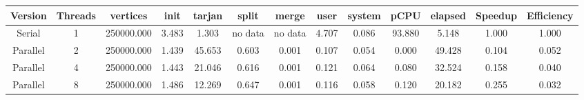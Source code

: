 \begin{tabular}{|c|c|c|c|c|c|c|c|c|c|c|c|c|}
\toprule
 Version &  Threads &   vertices &  init &  tarjan &   split &   merge &  user &  system &   pCPU &  elapsed &  Speedup &  Efficiency \\
\midrule
  Serial &        1 & 250000.000 & 3.483 &   1.303 & no data & no data & 4.707 &   0.086 & 93.880 &    5.148 &    1.000 &       1.000 \\
Parallel &        2 & 250000.000 & 1.439 &  45.653 &   0.603 &   0.001 & 0.107 &   0.054 &  0.000 &   49.428 &    0.104 &       0.052 \\
Parallel &        4 & 250000.000 & 1.443 &  21.046 &   0.616 &   0.001 & 0.121 &   0.064 &  0.080 &   32.524 &    0.158 &       0.040 \\
Parallel &        8 & 250000.000 & 1.486 &  12.269 &   0.647 &   0.001 & 0.116 &   0.058 &  0.120 &   20.182 &    0.255 &       0.032 \\
\bottomrule
\end{tabular}
